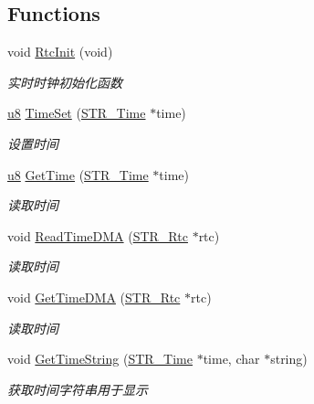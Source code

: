 \subsection*{\-Functions}
\begin{DoxyCompactItemize}
\item 
void \hyperlink{group___r_t_c_gaa884644b359833678d1f4bde7c214e32}{\-Rtc\-Init} (void)
\begin{DoxyCompactList}\small\item\em 实时时钟初始化函数 \end{DoxyCompactList}\item 
\hyperlink{group___b_s_p_gaed742c436da53c1080638ce6ef7d13de}{u8} \hyperlink{group___r_t_c_gad69809279bbf3aba7d8e066605e8950d}{\-Time\-Set} (\hyperlink{struct_s_t_r___time}{\-S\-T\-R\-\_\-\-Time} $\ast$time)
\begin{DoxyCompactList}\small\item\em 设置时间 \end{DoxyCompactList}\item 
\hyperlink{group___b_s_p_gaed742c436da53c1080638ce6ef7d13de}{u8} \hyperlink{group___r_t_c_gad9a05048b632c9b164c3735a93a07e98}{\-Get\-Time} (\hyperlink{struct_s_t_r___time}{\-S\-T\-R\-\_\-\-Time} $\ast$time)
\begin{DoxyCompactList}\small\item\em 读取时间 \end{DoxyCompactList}\item 
void \hyperlink{group___r_t_c_gad63ba0576495490f98a46bbd85e9ad49}{\-Read\-Time\-D\-M\-A} (\hyperlink{struct_s_t_r___rtc}{\-S\-T\-R\-\_\-\-Rtc} $\ast$rtc)
\begin{DoxyCompactList}\small\item\em 读取时间 \end{DoxyCompactList}\item 
void \hyperlink{group___r_t_c_gaf889c27a181d6c5c14b9c3e0c5a3e58f}{\-Get\-Time\-D\-M\-A} (\hyperlink{struct_s_t_r___rtc}{\-S\-T\-R\-\_\-\-Rtc} $\ast$rtc)
\begin{DoxyCompactList}\small\item\em 读取时间 \end{DoxyCompactList}\item 
void \hyperlink{group___r_t_c_gab14f1be5febcc98f825a51a2ed15e7fc}{\-Get\-Time\-String} (\hyperlink{struct_s_t_r___time}{\-S\-T\-R\-\_\-\-Time} $\ast$time, char $\ast$string)
\begin{DoxyCompactList}\small\item\em 获取时间字符串用于显示 \end{DoxyCompactList}\item 

\end{DoxyCompactItemize}
